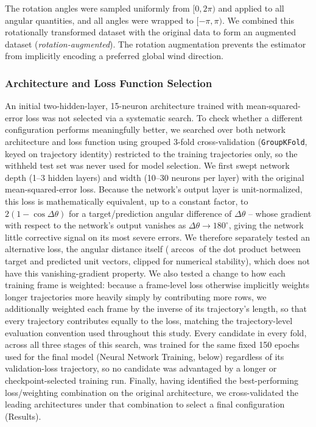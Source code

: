 \documentclass[11pt]{article}
\begin{document}
The rotation angles were sampled uniformly from $[0,2\pi)$ and applied to all angular quantities, and all angles were wrapped to $[-\pi,\pi)$. We combined this rotationally transformed dataset with the original data to form an augmented dataset (\textit{rotation-augmented}). The rotation augmentation prevents the estimator from implicitly encoding a preferred global wind direction. 

\subsubsection*{Architecture and Loss Function Selection}
An initial two-hidden-layer, 15-neuron architecture trained with mean-squared-error loss was not selected via a systematic search. To check whether a different configuration performs meaningfully better, we searched over both network architecture and loss function using grouped 3-fold cross-validation (\texttt{GroupKFold}, keyed on trajectory identity) restricted to the training trajectories only, so the withheld test set was never used for model selection. We first swept network depth (1--3 hidden layers) and width (10--30 neurons per layer) with the original mean-squared-error loss. Because the network's output layer is unit-normalized, this loss is mathematically equivalent, up to a constant factor, to $2(1-\cos\Delta\theta)$ for a target/prediction angular difference of $\Delta\theta$ -- whose gradient with respect to the network's output vanishes as $\Delta\theta \to 180^\circ$, giving the network little corrective signal on its most severe errors. We therefore separately tested an alternative loss, the angular distance itself ($\arccos$ of the dot product between target and predicted unit vectors, clipped for numerical stability), which does not have this vanishing-gradient property. We also tested a change to how each training frame is weighted: because a frame-level loss otherwise implicitly weights longer trajectories more heavily simply by contributing more rows, we additionally weighted each frame by the inverse of its trajectory's length, so that every trajectory contributes equally to the loss, matching the trajectory-level evaluation convention used throughout this study. Every candidate in every fold, across all three stages of this search, was trained for the same fixed 150 epochs used for the final model (Neural Network Training, below) regardless of its validation-loss trajectory, so no candidate was advantaged by a longer or checkpoint-selected training run. Finally, having identified the best-performing loss/weighting combination on the original architecture, we cross-validated the leading architectures under that combination to select a final configuration (Results).
\end{document}
